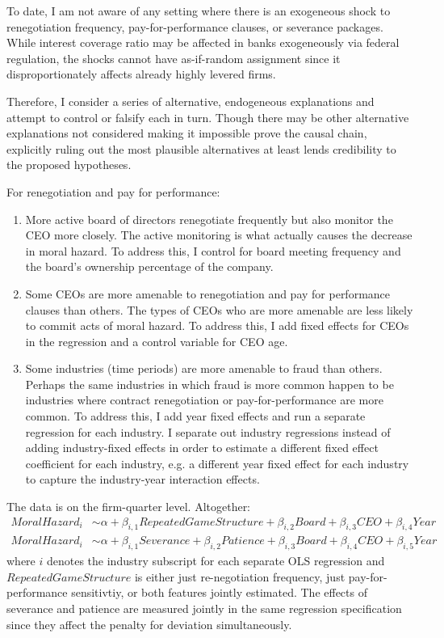 \documentclass{article}
\begin{document}
To date, I am not aware of any setting where there is an exogeneous shock to renegotiation frequency, pay-for-performance clauses, or severance packages. While interest coverage ratio may be affected in banks exogeneously via federal regulation, the shocks cannot have as-if-random assignment since it disproportionately affects already highly levered firms.
\par Therefore, I consider a series of alternative, endogeneous explanations and attempt to control or falsify each in turn. Though there may be other alternative explanations not considered making it impossible prove the causal chain, explicitly ruling out the most plausible alternatives at least lends credibility to the proposed hypotheses.
\par For renegotiation and pay for performance:
\begin{enumerate}
	\item More active board of directors renegotiate frequently but also monitor the CEO more closely. The active monitoring is what actually causes the decrease in moral hazard.
	\subitem To address this, I control for board meeting frequency and the board's ownership percentage of the company.
	\item Some CEOs are more amenable to renegotiation and pay for performance clauses than others. The types of CEOs who are more amenable are less likely to commit acts of moral hazard.
	\subitem To address this, I add fixed effects for CEOs in the regression and a control variable for CEO age.
	\item Some industries (time periods) are more amenable to fraud than others. Perhaps the same industries in which fraud is more common happen to be industries where contract renegotiation or pay-for-performance are more common.
	\subitem To address this, I add year fixed effects and run a separate regression for each industry. I separate out industry regressions instead of adding industry-fixed effects in order to estimate a different fixed effect coefficient for each industry, e.g. a different year fixed effect for each industry to capture the industry-year interaction effects.
\end{enumerate}
\par The data is on the firm-quarter level. Altogether:
\begin{align*}
Moral Hazard_i &\sim \alpha + \beta_{i,1} RepeatedGameStructure + \beta_{i,2} Board + \beta_{i,3} CEO + \beta_{i,4} Year\\
Moral Hazard_i &\sim \alpha + \beta_{i,1} Severance + \beta_{i,2} Patience + \beta_{i,3} Board + \beta_{i,4} CEO + \beta_{i,5} Year
\end{align*}
where $i$ denotes the industry subscript for each separate OLS regression and $RepeatedGameStructure$ is either just re-negotiation frequency, just pay-for-performance sensitivtiy, or both features jointly estimated. The effects of severance and patience are measured jointly in the same regression specification since they affect the penalty for deviation simultaneously.
\end{document}
